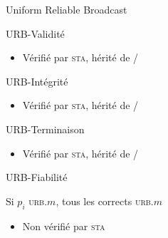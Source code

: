 
\begingroup

\begin{frame}{Uniform Reliable Broadcast}

  \begin{block}{URB-Validité}
    \begin{center}
      \vspace{-3mm}
      \vspace{-3mm}
    \end{center}
    \begin{itemize}
    \item Vérifié par \textsc{sta}, hérité de \Send/\Receive
    \end{itemize}
  \end{block}

  \begin{block}{URB-Intégrité}
    \begin{center}
      \vspace{-3mm}
      \vspace{-3mm}
    \end{center}
    \begin{itemize}
    \item Vérifié par \textsc{sta}, hérité de \Send/\Receive
    \end{itemize}
  \end{block}

  \begin{block}{URB-Terminaison}
    \begin{center}
      \vspace{-3mm}
      \vspace{-3mm}
    \end{center}
    \begin{itemize}
    \item Vérifié par \textsc{sta}, hérité de \Send/\Receive
    \end{itemize}
  \end{block}

  \begin{alertblock}{URB-Fiabilité}
    \begin{center}
      \vspace{-3mm}
      \alert{Si $p_i$ \textsc{urb}.\Deliver $m$, tous les corrects \textsc{urb}.\Deliver $m$}
      \vspace{-3mm}
    \end{center}
    \begin{itemize}
    \item Non vérifié par \textsc{sta}
    \end{itemize}
  \end{alertblock}

  
\end{frame}

\endgroup
\endinput
